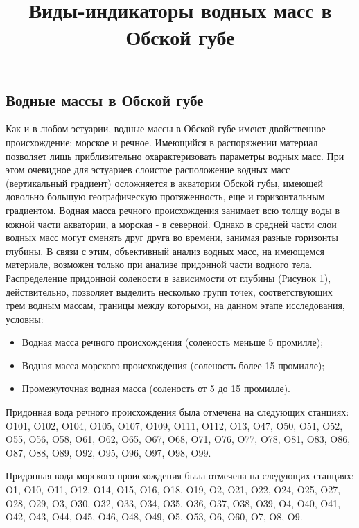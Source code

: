 \documentclass[
]{article}
\title{Виды-индикаторы водных масс в Обской губе}
\author{}
\date{\vspace{-2.5em}}
\providecommand{\tightlist}{%
  \setlength{\itemsep}{0pt}\setlength{\parskip}{0pt}}
\begin{document}
\maketitle

\hypertarget{ux432ux43eux434ux43dux44bux435-ux43cux430ux441ux441ux44b-ux432-ux43eux431ux441ux43aux43eux439-ux433ux443ux431ux435}{%
\subsection{Водные массы в Обской
губе}\label{ux432ux43eux434ux43dux44bux435-ux43cux430ux441ux441ux44b-ux432-ux43eux431ux441ux43aux43eux439-ux433ux443ux431ux435}}

Как и в любом эстуарии, водные массы в Обской губе имеют двойственное
происхождение: морское и речное. Имеющийся в распоряжении материал
позволяет лишь приблизительно охарактеризовать параметры водных масс.
При этом очевидное для эстуариев слоистое расположение водных масс
(вертикальный градиент) осложняется в акватории Обской губы, имеющей
довольно большую географическую протяженность, еще и горизонтальным
градиентом. Водная масса речного происхождения занимает всю толщу воды в
южной части акватории, а морская - в северной. Однако в средней части
слои водных масс могут сменять друг друга во времени, занимая разные
горизонты глубины. В связи с этим, объективный анализ водных масс, на
имеющемся материале, возможен только при анализе придонной части водного
тела. Распределение придонной солености в зависимости от глубины
(Рисунок 1), действительно, позволяет выделить несколько групп точек,
соответствующих трем водным массам, границы между которыми, на данном
этапе исследования, условны:

\begin{itemize}
\tightlist
\item
  Водная масса речного происхождения (соленость меньше 5 промилле);
\item
  Водная масса морского происхождения (соленость более 15 промилле);
\item
  Промежуточная водная масса (соленость от 5 до 15 промилле).
\end{itemize}

Придонная вода речного происхождения была отмечена на следующих
станциях: O101, O102, O104, O105, O107, O109, O111, O112, O13, O47, O50,
O51, O52, O55, O56, O58, O61, O62, O65, O67, O68, O71, O76, O77, O78,
O81, O83, O86, O87, O88, O89, O92, O95, O96, O97, O98, O99.

Придонная вода морского происхождения была отмечена на следующих
станциях: O1, O10, O11, O12, O14, O15, O16, O18, O19, O2, O21, O22, O24,
O25, O27, O28, O29, O3, O30, O32, O33, O34, O35, O36, O37, O38, O39, O4,
O40, O41, O42, O43, O44, O45, O46, O48, O49, O5, O53, O6, O60, O7, O8,
O9.
\end{document}
